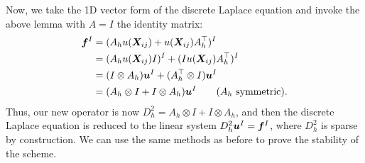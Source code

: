 \documentclass{article}
\renewcommand{\vec}{\vectorsym}
\begin{document}
Now, we take the 1D vector form of the discrete Laplace equation and invoke the above lemma with $A=I$ the identity matrix:
\begin{align*}
    \vec f^I &= (A_h u(\vec X_{ij}) + u(\vec X_{ij})A_h^\top)^I\\
    &= (A_h u(\vec X_{ij}) I)^I + (I u(\vec X_{ij})A_h^\top)^I\\
    &= (I\otimes A_h)\vec u^I + (A_h^\top \otimes I)\vec u^I\\
    &= (A_h\otimes I + I\otimes A_h)\vec u^I \tag{$A_h$ symmetric}.
\end{align*}
Thus, our new operator is now $D^2_h = A_h\otimes I + I\otimes A_h$, and then the discrete Laplace equation is reduced to the linear system $D^2_h \vec u^I = \vec f^I$, where $D^2_h$ is sparse by construction. We can use the same methods as before to prove the stability of the scheme.  
\end{document}
